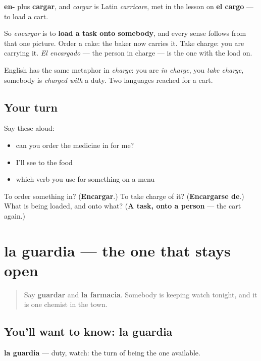 \begin{cousinweb}
\textbf{en-} plus \textbf{cargar}, and \emph{cargar} is Latin \emph{carricare}, met in the lesson on \textbf{el cargo} — to load a cart.

So \emph{encargar} is to \textbf{load a task onto somebody}, and every sense follows from that one picture. Order a cake: the baker now carries it. Take charge: you are carrying it. \emph{El encargado} — the person in charge — is the one with the load on.

English has the same metaphor in \emph{charge}: you are \emph{in charge}, you \emph{take charge}, somebody is \emph{charged with} a duty. Two languages reached for a cart.
\end{cousinweb}

\subsection*{Your turn}
Say these aloud:

\begin{itemize}
\raggedright
  \item can you order the medicine in for me?
  \item I'll see to the food
  \item which verb you use for something on a menu
\end{itemize}

\begin{tcolorbox}[breakable,colback=teal!4,colframe=teal!35!black,title={Before you move on}]
To order something in? (\textbf{Encargar}.) To take charge of it? (\textbf{Encargarse de}.) What is being loaded, and onto what? (\textbf{A task, onto a person} — the cart again.)
\end{tcolorbox}
\section[la guardia]{la guardia — the one that stays open}

\label{lesson:ES-C457-guardia}



\begin{quote}
Say \textbf{guardar} and \textbf{la farmacia}. Somebody is keeping watch tonight, and it is one chemist in the town.
\end{quote}

\subsection*{You'll want to know: la guardia}
\textbf{la guardia} — duty, watch: the turn of being the one available.

